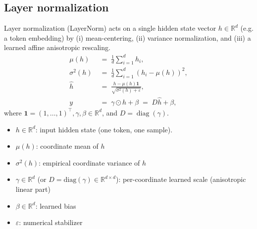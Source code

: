 \documentclass[a4paper,12pt]{article}
\begin{document}
\subsection{Layer normalization}
Layer normalization (LayerNorm) acts on a single hidden state vector \(h\in\mathbb{R}^d\) (e.g. a token embedding) by (i) mean-centering, (ii) variance normalization, and (iii) a learned affine anisotropic rescaling.
\begin{align}
\mu(h) &\;=\; \frac{1}{d}\sum_{i=1}^d h_i, \\
\sigma^2(h) &\;=\; \frac{1}{d}\sum_{i=1}^d (h_i-\mu(h))^2, \\
\widehat{h} &\;=\; \frac{h - \mu(h)\mathbf{1}}{\sqrt{\sigma^2(h)+\varepsilon}}, \label{eq:ln_norm}\\
y &\;=\; \gamma \odot \widehat{h} + \beta \;=\; D\widehat{h} + \beta, \label{eq:ln_affine}
\end{align}
where \(\mathbf{1}=(1,\dots,1)^\top , \gamma, \beta \in\mathbb{R}^d\), and \(D=\operatorname{diag}(\gamma)\).


\begin{itemize}
  \item \(h\in\mathbb{R}^d\): input hidden state (one token, one sample).
  \item \(\mu(h)\): coordinate mean of \(h\)
  \item \(\sigma^2(h)\): empirical coordinate variance of \(h\)
  \item \(\gamma\in\mathbb{R}^d\) (or \(D=\mathrm{diag}(\gamma)\in\mathbb{R}^{d\times d}\)): per-coordinate learned scale (anisotropic linear part)
  \item \(\beta\in\mathbb{R}^d\): learned bias
  \item \(\varepsilon\): numerical stabilizer
\end{itemize}
\end{document}

